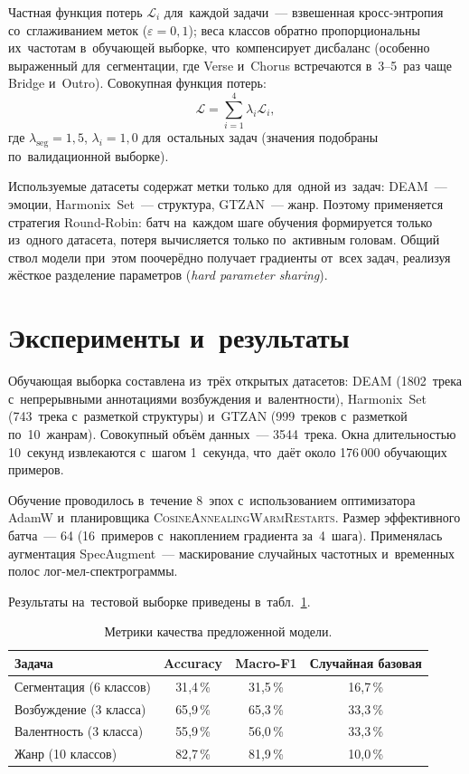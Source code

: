 \documentclass{stud-conf-pmk}
\begin{document}
\begin{paper}
Частная функция потерь $\mathcal{L}_i$ для~каждой задачи~--- взвешенная кросс-энтропия со~сглаживанием меток ($\varepsilon = 0{,}1$); веса классов обратно пропорциональны их~частотам в~обучающей выборке, что~компенсирует дисбаланс (особенно выраженный для~сегментации, где Verse и~Chorus встречаются в~3--5~раз чаще Bridge и~Outro). Совокупная функция потерь:
$$\mathcal{L} = \sum_{i=1}^{4} \lambda_i \mathcal{L}_i,$$
где $\lambda_{\text{seg}} = 1{,}5$, $\lambda_i = 1{,}0$ для~остальных задач (значения подобраны по~валидационной выборке).

Используемые датасеты содержат метки только для~одной из~задач: DEAM~--- эмоции, Harmonix~Set~--- структура, GTZAN~--- жанр. Поэтому применяется стратегия Round-Robin: батч на~каждом шаге обучения формируется только из~одного датасета, потеря вычисляется только по~активным головам. Общий ствол модели при~этом поочерёдно получает градиенты от~всех задач, реализуя жёсткое разделение параметров (\textit{hard parameter sharing}).


\section{Эксперименты и~результаты}

Обучающая выборка составлена из~трёх открытых датасетов: DEAM (1802~трека с~непрерывными аннотациями возбуждения и~валентности), Harmonix~Set (743~трека с~разметкой структуры) и~GTZAN (999~треков с~разметкой по~10~жанрам). Совокупный объём данных~--- 3544~трека. Окна длительностью 10~секунд извлекаются с~шагом 1~секунда, что~даёт около 176\,000 обучающих примеров.

Обучение проводилось в~течение 8~эпох с~использованием оптимизатора AdamW и~планировщика \textsc{CosineAnnealingWarmRestarts}. Размер эффективного батча~--- 64 (16~примеров с~накоплением градиента за~4~шага). Применялась аугментация SpecAugment~--- маскирование случайных частотных и~временных полос лог-мел-спектрограммы.

Результаты на~тестовой выборке приведены в~табл.~\ref{tab:results}.

\begin{table}
\centering
\caption{Метрики качества предложенной модели.}
\begin{tabular}{|l|c|c|c|}
\hline
Задача & Accuracy & Macro-F1 & Случайная базовая \\
\hline
Сегментация (6 классов) & 31{,}4\,\% & 31{,}5\,\% & 16{,}7\,\% \\
\hline
Возбуждение (3 класса) & 65{,}9\,\% & 65{,}3\,\% & 33{,}3\,\% \\
\hline
Валентность (3 класса) & 55{,}9\,\% & 56{,}0\,\% & 33{,}3\,\% \\
\hline
Жанр (10 классов) & 82{,}7\,\% & 81{,}9\,\% & 10{,}0\,\% \\
\hline
\end{tabular}
\label{tab:results}
\end{table}


\end{paper}
\end{document}
